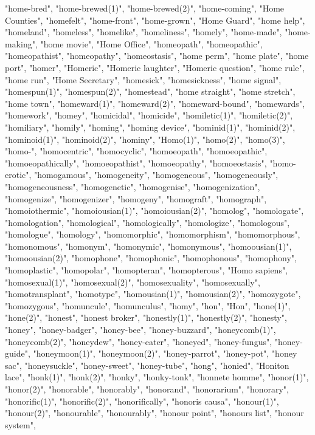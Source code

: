 "home-bred",
"home-brewed(1)",
"home-brewed(2)",
"home-coming",
"Home Counties",
"homefelt",
"home-front",
"home-grown",
"Home Guard",
"home help",
"homeland",
"homeless",
"homelike",
"homeliness",
"homely",
"home-made",
"home-making",
"home movie",
"Home Office",
"homeopath",
"homeopathic",
"homeopathist",
"homeopathy",
"homeostasis",
"home perm",
"home plate",
"home port",
"homer",
"Homeric",
"Homeric laughter",
"Homeric question",
"home rule",
"home run",
"Home Secretary",
"homesick",
"homesickness",
"home signal",
"homespun(1)",
"homespun(2)",
"homestead",
"home straight",
"home stretch",
"home town",
"homeward(1)",
"homeward(2)",
"homeward-bound",
"homewards",
"homework",
"homey",
"homicidal",
"homicide",
"homiletic(1)",
"homiletic(2)",
"homiliary",
"homily",
"homing",
"homing device",
"hominid(1)",
"hominid(2)",
"hominoid(1)",
"hominoid(2)",
"hominy",
"Homo(1)",
"homo(2)",
"homo(3)",
"homo-",
"homocentric",
"homocyclic",
"homoeopath",
"homoeopathic",
"homoeopathically",
"homoeopathist",
"homoeopathy",
"homoeostasis",
"homo-erotic",
"homogamous",
"homogeneity",
"homogeneous",
"homogeneously",
"homogeneousness",
"homogenetic",
"homogenise",
"homogenization",
"homogenize",
"homogenizer",
"homogeny",
"homograft",
"homograph",
"homoiothermic",
"homoiousian(1)",
"homoiousian(2)",
"homolog",
"homologate",
"homologation",
"homological",
"homologically",
"homologize",
"homologous",
"homologue",
"homology",
"homomorphic",
"homomorphism",
"homomorphous",
"homonomous",
"homonym",
"homonymic",
"homonymous",
"homoousian(1)",
"homoousian(2)",
"homophone",
"homophonic",
"homophonous",
"homophony",
"homoplastic",
"homopolar",
"homopteran",
"homopterous",
"Homo sapiens",
"homosexual(1)",
"homosexual(2)",
"homosexuality",
"homosexually",
"homotransplant",
"homotype",
"homousian(1)",
"homousian(2)",
"homozygote",
"homozygous",
"homuncule",
"homunculus",
"homy",
"hon",
"Hon",
"hone(1)",
"hone(2)",
"honest",
"honest broker",
"honestly(1)",
"honestly(2)",
"honesty",
"honey",
"honey-badger",
"honey-bee",
"honey-buzzard",
"honeycomb(1)",
"honeycomb(2)",
"honeydew",
"honey-eater",
"honeyed",
"honey-fungus",
"honey-guide",
"honeymoon(1)",
"honeymoon(2)",
"honey-parrot",
"honey-pot",
"honey sac",
"honeysuckle",
"honey-sweet",
"honey-tube",
"hong",
"honied",
"Honiton lace",
"honk(1)",
"honk(2)",
"honky",
"honky-tonk",
"honnete homme",
"honor(1)",
"honor(2)",
"honorable",
"honorably",
"honorand",
"honorarium",
"honorary",
"honorific(1)",
"honorific(2)",
"honorifically",
"honoris causa",
"honour(1)",
"honour(2)",
"honourable",
"honourably",
"honour point",
"honours list",
"honour system",
